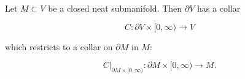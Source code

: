 Let $M \subset V$ be a closed neat submanifold. Then $\partial V$ has a collar

$$C: \partial V \times [0, \infty) \to V$$

which restricts to a collar on $\partial M$ in $M$:

$$C|_{\partial M \times [0, \infty)}: \partial M \times [0, \infty) \to M.$$
